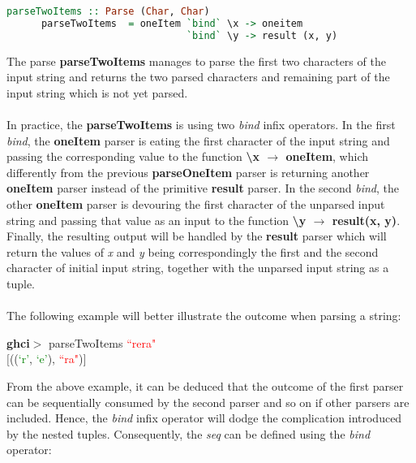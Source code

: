 \documentclass[a4paper, onecolumn]{article}
\begin{document}
    \begin{tcolorbox}
    \begin{lstlisting}[language=Haskell]
      parseTwoItems :: Parse (Char, Char)
      parseTwoItems  = oneItem `bind` \x -> oneitem 
                               `bind` \y -> result (x, y)
    \end{lstlisting}
    \end{tcolorbox}
    
    The parse \textbf{parseTwoItems} manages to parse the first two characters of the input string and returns the two parsed characters and remaining part of the input string which is not yet parsed. \\ \\
    In practice, the \textbf{parseTwoItems} is using two \textit{bind} infix operators. In the first \textit{bind}, the \textbf{oneItem} parser is eating the first character of the input string and passing the corresponding value to the function \textbf{\textbackslash x $\rightarrow$ oneItem}, which differently from the previous \textbf{parseOneItem} parser is returning another \textbf{oneItem} parser instead of the primitive \textbf{result} parser. In the second \textit{bind}, the  other \textbf{oneItem} parser is devouring the first character of the unparsed input string and passing that value as an input to the function \textbf{\textbackslash y $\rightarrow$ result(x, y)}. Finally, the resulting output will be handled by the \textbf{result} parser which will return the values of \textit{x} and \textit{y} being correspondingly the first and the second character of initial input string, together with the unparsed input string as a tuple. \\ \\ 
    The following example will better illustrate the outcome when parsing a string:
       \begin{center}
            \textbf{ghci$>$} parseTwoItems \textcolor{red}{``rera"} \\
            $\big[$((\textcolor{green}{`r'}, \textcolor{green}{`e'}), \textcolor{red}{``ra"})$\big]$
        \end{center}
        
    From the above example, it can be deduced that the outcome of the first parser can be sequentially consumed by the second parser and so on if other parsers are included. Hence, the \textit{bind} infix operator will dodge the complication introduced by the nested tuples. Consequently, the \textit{seq} can be defined using the \textit{bind} operator: 
    
\end{document}
